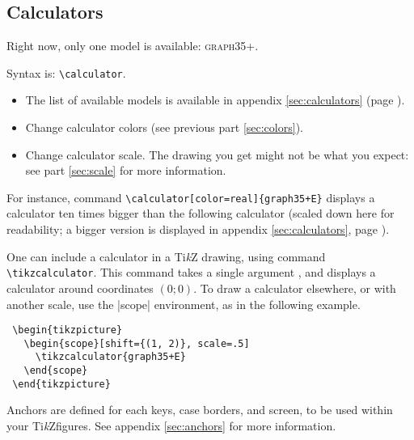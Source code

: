 \documentclass{ltxdoc}
\newcommand{\TikZ}{Ti\emph{k}Z}
\begin{document}

 \subsection{Calculators}

 \DescribeMacro{\calculator}
 Right now, only one model is available: \textsc{graph35+}.

 Syntax is: \lstinline|\calculator|.

 \begin{itemize}
 \item {} The list of available models is available in appendix \ref{sec:calculators} (page \pageref{sec:calculators}).
 \item {} Change calculator colors (see previous part \ref{sec:colors}).
 \item {} Change calculator scale. The drawing you get might not be what you expect: see part \ref{sec:scale} for more information.
 \end{itemize}

 For instance, command \lstinline|\calculator[color=real]{graph35+E}| displays a calculator ten times bigger than the following calculator (scaled down here for readability; a bigger version is displayed in appendix \ref{sec:calculators}, page \pageref{sec:calculators}).

 \begin{center}
 \end{center}

 \DescribeMacro{\tikzcalculator}
 One can include a calculator in a \TikZ{} drawing, using command \lstinline|\tikzcalculator|. This command takes a single argument , and displays a calculator around coordinates $(0; 0)$. To draw a calculator elsewhere, or with another scale, use the |scope| environment, as in the following example.

 \begin{lstlisting}
 \begin{tikzpicture}
   \begin{scope}[shift={(1, 2)}, scale=.5]
     \tikzcalculator{graph35+E}
   \end{scope}
 \end{tikzpicture}
 \end{lstlisting}

 Anchors are defined for each keys, case borders, and screen, to be used within your \TikZ figures. See appendix \ref{sec:anchors} for more information.
\end{document}
